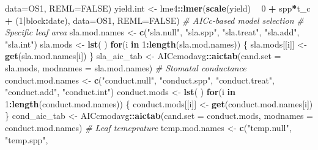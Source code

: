 \documentclass[]{scrartcl}
\newenvironment{Shaded}{\begin{snugshade}}{\end{snugshade}}
\newcommand{\CommentTok}[1]{\textcolor[rgb]{0.56,0.35,0.01}{\textit{#1}}}
\newcommand{\ControlFlowTok}[1]{\textcolor[rgb]{0.13,0.29,0.53}{\textbf{#1}}}
\newcommand{\DataTypeTok}[1]{\textcolor[rgb]{0.13,0.29,0.53}{#1}}
\newcommand{\DecValTok}[1]{\textcolor[rgb]{0.00,0.00,0.81}{#1}}
\newcommand{\KeywordTok}[1]{\textcolor[rgb]{0.13,0.29,0.53}{\textbf{#1}}}
\newcommand{\NormalTok}[1]{#1}
\newcommand{\OperatorTok}[1]{\textcolor[rgb]{0.81,0.36,0.00}{\textbf{#1}}}
\newcommand{\OtherTok}[1]{\textcolor[rgb]{0.56,0.35,0.01}{#1}}
\newcommand{\StringTok}[1]{\textcolor[rgb]{0.31,0.60,0.02}{#1}}
\begin{document}
\begin{Shaded}
\begin{Highlighting}[]
{{{{{{{{{{{{                            \DataTypeTok{data=}\NormalTok{OS1, }\DataTypeTok{REML=}\OtherTok{FALSE}\NormalTok{)}
\NormalTok{    yield.int <-}\StringTok{ }\NormalTok{lme4}\OperatorTok{::}\KeywordTok{lmer}\NormalTok{(}\KeywordTok{scale}\NormalTok{(yield) }\OperatorTok{~}\StringTok{ }\DecValTok{0} \OperatorTok{+}\StringTok{ }\NormalTok{spp}\OperatorTok{*}\NormalTok{t_c }\OperatorTok{+}\StringTok{ }\NormalTok{(}\DecValTok{1}\OperatorTok{|}\NormalTok{block}\OperatorTok{:}\NormalTok{date), }
                            \DataTypeTok{data=}\NormalTok{OS1, }\DataTypeTok{REML=}\OtherTok{FALSE}\NormalTok{)}
\CommentTok{# AICc-based model selection }
  \CommentTok{# Specific leaf area }
\NormalTok{    sla.mod.names <-}\StringTok{ }\KeywordTok{c}\NormalTok{(}\StringTok{"sla.null"}\NormalTok{, }\StringTok{"sla.spp"}\NormalTok{, }
                       \StringTok{"sla.treat"}\NormalTok{, }\StringTok{"sla.add"}\NormalTok{,}
                       \StringTok{"sla.int"}\NormalTok{)}
\NormalTok{    sla.mods <-}\StringTok{ }\KeywordTok{lst}\NormalTok{( )}  
   \ControlFlowTok{for}\NormalTok{(i }\ControlFlowTok{in} \DecValTok{1}\OperatorTok{:}\KeywordTok{length}\NormalTok{(sla.mod.names)) \{}
\NormalTok{    sla.mods[[i]] <-}\StringTok{ }\KeywordTok{get}\NormalTok{(sla.mod.names[i]) \}}
\NormalTok{  sla_aic_tab <-}\StringTok{ }\NormalTok{AICcmodavg}\OperatorTok{::}\KeywordTok{aictab}\NormalTok{(}\DataTypeTok{cand.set =}\NormalTok{ sla.mods, }
                                    \DataTypeTok{modnames =}\NormalTok{ sla.mod.names) }
  \CommentTok{# Stomatal conductance}
\NormalTok{    conduct.mod.names <-}\StringTok{ }\KeywordTok{c}\NormalTok{(}\StringTok{"conduct.null"}\NormalTok{, }\StringTok{"conduct.spp"}\NormalTok{, }
                           \StringTok{"conduct.treat"}\NormalTok{, }\StringTok{"conduct.add"}\NormalTok{, }
                           \StringTok{"conduct.int"}\NormalTok{)}
\NormalTok{    conduct.mods <-}\StringTok{ }\KeywordTok{lst}\NormalTok{( )} 
     \ControlFlowTok{for}\NormalTok{(i }\ControlFlowTok{in} \DecValTok{1}\OperatorTok{:}\KeywordTok{length}\NormalTok{(conduct.mod.names)) \{}
\NormalTok{        conduct.mods[[i]] <-}\StringTok{ }\KeywordTok{get}\NormalTok{(conduct.mod.names[i]) \}}
\NormalTok{      cond_aic_tab <-}\StringTok{ }\NormalTok{AICcmodavg}\OperatorTok{::}\KeywordTok{aictab}\NormalTok{(}\DataTypeTok{cand.set =}\NormalTok{ conduct.mods, }
                                         \DataTypeTok{modnames =}\NormalTok{ conduct.mod.names)  }
  \CommentTok{# Leaf temeprature}
\NormalTok{    temp.mod.names <-}\StringTok{ }\KeywordTok{c}\NormalTok{(}\StringTok{"temp.null"}\NormalTok{, }\StringTok{"temp.spp"}\NormalTok{, }
}}}}}}}}}}}}
\end{Highlighting}
\end{Shaded}
\end{document}

